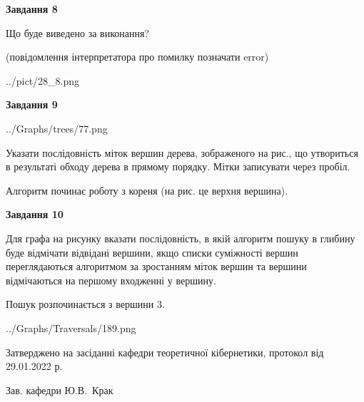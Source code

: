 \documentclass[12pt, ukrainian]{article}
\begin{document}
{\begin {large}
{\begin {center}\textbf{Завдання 8}\end {center}}\par
Що буде виведено за виконання?\par
 (повідомлення інтерпретатора про помилку позначати error)\par
\begin{center}
	{../pict/28_8.png}
\end{center}
\newpage

{\begin {center}\textbf{Завдання 9}\end {center}}\par

\begin{center}
	{../Graphs/trees/77.png}
\end{center}
Указати послідовність міток вершин дерева, зображеного на рис., що утвориться в результаті обходу дерева в прямому порядку. Мітки записувати через пробіл.\par Алгоритм починає роботу з кореня (на рис. це верхня вершина).\par
\newpage

{\begin {center}\textbf{Завдання 10}\end {center}}\par
Для графа на рисунку вказати послідовність, в якій алгоритм пошуку в глибину буде відмічати відвідані вершини, якщо списки суміжності вершин переглядаються алгоритмом за зростанням міток вершин та вершини відмічаються на першому вход\-женні у вершину.\par
Пошук розпочинається з вершини 3.\par

\begin{center}
	{../Graphs/Traversals/189.png}
\end{center}\par
\newpage


\end {large}
}
{\smallskip \begin {small} Затверджено на засіданні кафедри теоретичної кібернетики, протокол  від   29.01.2022 р.\par\smallskip\smallskip
{\parbox {6.5 cm}{Зав. кафедри \dotfill Ю.В.~Крак}} \end{small}}
\end{document}
